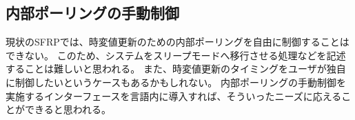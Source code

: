 
\subsection{内部ポーリングの手動制御}
現状のSFRPでは、時変値更新のための内部ポーリングを自由に制御することはできない。
このため、システムをスリープモードへ移行させる処理などを記述することは難しいと思われる。
また、時変値更新のタイミングをユーザが独自に制御したいというケースもあるかもしれない。
内部ポーリングの手動制御を実施するインターフェースを言語内に導入すれば、そういったニーズに応えることができると思われる。
